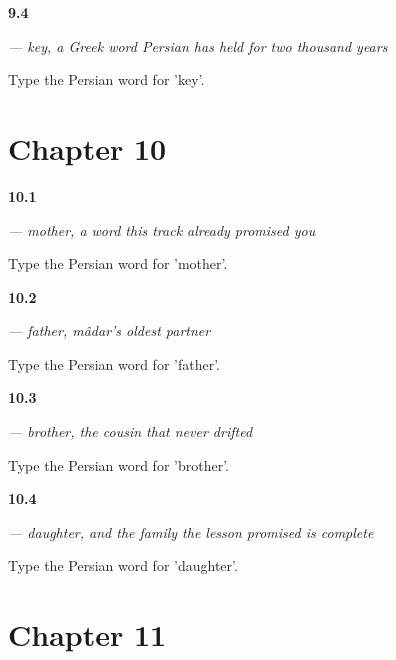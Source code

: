 \noindent\begin{minipage}[t]{\linewidth}
\raggedright
\hypertarget{review-FA-C09-kelid-request}{\textbf{9.4}} \emph{ — key, a Greek word Persian has held for two thousand years}\par
\small Type the Persian word for 'key'.
\end{minipage}\par\medskip

\section*{Chapter 10}

\noindent\begin{minipage}[t]{\linewidth}
\raggedright
\hypertarget{review-FA-C10-madar-meaning}{\textbf{10.1}} \emph{ — mother, a word this track already promised you}\par
\small Type the Persian word for 'mother'.
\end{minipage}\par\medskip

\noindent\begin{minipage}[t]{\linewidth}
\raggedright
\hypertarget{review-FA-C10-pedar-meaning}{\textbf{10.2}} \emph{ — father, mâdar's oldest partner}\par
\small Type the Persian word for 'father'.
\end{minipage}\par\medskip

\noindent\begin{minipage}[t]{\linewidth}
\raggedright
\hypertarget{review-FA-C10-baradar-meaning}{\textbf{10.3}} \emph{ — brother, the cousin that never drifted}\par
\small Type the Persian word for 'brother'.
\end{minipage}\par\medskip

\noindent\begin{minipage}[t]{\linewidth}
\raggedright
\hypertarget{review-FA-C10-dokhtar-meaning}{\textbf{10.4}} \emph{ — daughter, and the family the  lesson promised is complete}\par
\small Type the Persian word for 'daughter'.
\end{minipage}\par\medskip

\section*{Chapter 11}

